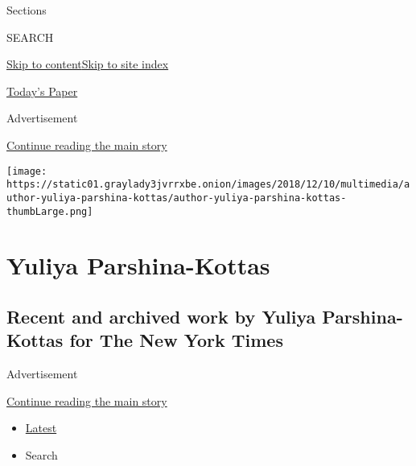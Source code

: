 Sections

SEARCH

\protect\hyperlink{site-content}{Skip to
content}\protect\hyperlink{site-index}{Skip to site index}

\href{https://myaccount.nytimes3xbfgragh.onion/auth/login?response_type=cookie\&client_id=vi}{}

\href{https://www.nytimes3xbfgragh.onion/section/todayspaper}{Today's
Paper}

Advertisement

\protect\hyperlink{after-top}{Continue reading the main story}

\texttt{[image: https://static01.graylady3jvrrxbe.onion/images/2018/12/10/multimedia/author-yuliya-parshina-kottas/author-yuliya-parshina-kottas-thumbLarge.png]}

\hypertarget{yuliya-parshina-kottas}{%
\section{Yuliya Parshina-Kottas}\label{yuliya-parshina-kottas}}

\hypertarget{recent-and-archived-work-by-yuliya-parshina-kottas-for-the-new-york-times}{%
\subsection{Recent and archived work by Yuliya Parshina-Kottas for The
New York
Times}\label{recent-and-archived-work-by-yuliya-parshina-kottas-for-the-new-york-times}}

Advertisement

\protect\hyperlink{after-mid1}{Continue reading the main story}

\begin{itemize}
\tightlist
\item
  \protect\hyperlink{stream-panel}{Latest}
\item
  Search
\end{itemize}

